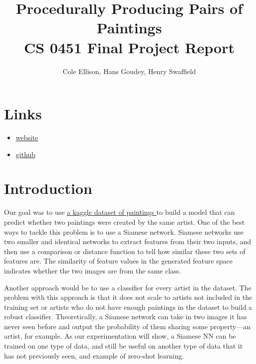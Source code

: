 \documentclass[a4paper, 11pt]{article}
\begin{document}

\title{Procedurally Producing Pairs of Paintings \\ \medskip
\large{CS 0451 Final Project Report}}
\author{Cole Ellison, Hans Goudey, Henry Swaffield}
\maketitle

\newcommand{\link}[2]{\color{blue}\href{#1}{#2}\color{black}}
\newcommand{\confusion}[4]{
  \medskip
  \begin{tabular}{|c|c|}
    \hline
    #1 & #2 \\
    \hline
    #3 & #4 \\
    \hline
  \end{tabular}
  \medskip
}

\section{Links}
\begin{itemize}
  \item \link{http://www.cs.middlebury.edu/~crellison/cs451/}{website}
  \item \link{https://github.com/crellison/finalML}{github}
\end{itemize}

\section{Introduction}

Our goal was to use \link{https://www.kaggle.com/c/painter-by-numbers}{a kaggle dataset of paintings } to build a model that can predict whether two paintings were created by the same artist. One of the best ways to tackle this problem is to use a Siamese network. Siamese networks use two smaller and identical networks to extract features from their two inputs, and then use a comparison or distance function to tell how similar these two sets of features are. The similarity of feature values in the generated feature space indicates whether the two images are from the same class.

Another approach would be to use a classifier for every artist in the dataset. The problem with this approach is that it does not scale to artists not included in the training set or artists who do not have enough paintings in the dataset to build a robust classifier. Theoretically, a Siamese network can take in two images it has never seen before and output the probability of them sharing some property—an artist, for example. As our experimentation will show, a Siamese NN can be trained on one type of data, and still be useful on another type of data that it has not previously seen, and example of zero-shot learning.
\end{document}
